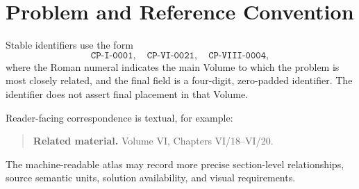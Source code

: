 \chapter*{Problem and Reference Convention}

Stable identifiers use the form
\[
  \texttt{CP-I-0001},\quad \texttt{CP-VI-0021},\quad \texttt{CP-VIII-0004},
\]
where the Roman numeral indicates the main Volume to which the problem is most closely
related, and the final field is a four-digit, zero-padded identifier. The identifier does not assert final placement in that Volume.

Reader-facing correspondence is textual, for example:
\begin{quote}
\textbf{Related material.} Volume VI, Chapters VI/18--VI/20.
\end{quote}

The machine-readable atlas may record more precise section-level relationships, source
semantic units, solution availability, and visual requirements.
